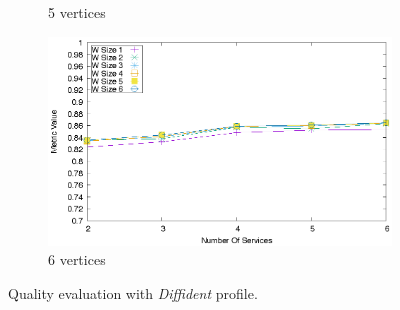 \begin{figure}[ht!]
\begin{subfigure}{0.33\textwidth}
    \caption{5 vertices}
    \label{fig:quality_window_bad_c}
  \end{subfigure}
  \hfill
  \begin{subfigure}{0.33\textwidth}
    \includegraphics[width=\textwidth]{Images/graphs/quality_plot_bad_n6.eps}
    \caption{6 vertices}
    \label{fig:quality_window_bad_d}
  \end{subfigure}

  \caption{Quality evaluation with \textit{Diffident} profile.}
  \label{fig:quality_window_bad}
\end{figure}


